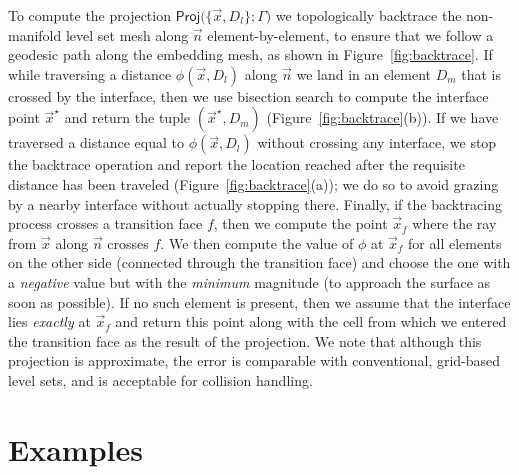 To compute the projection
$\textsf{Proj(}\{\vec{x},D_l\};\Gamma\textsf{)}$ we topologically
backtrace the non-manifold level set mesh along $\vec{n}$
element-by-element, to ensure that we follow a geodesic path along the
embedding mesh, as shown in Figure~\ref{fig:backtrace}. If while
traversing a distance $\phi(\vec{x},D_l)$ along $\vec{n}$ we land in
an element $D_m$ that is crossed by the interface, then we use
bisection search to compute the interface point $\vec{x}^\star$ and
return the tuple $(\vec{x}^\star,D_m)$
(Figure~\ref{fig:backtrace}(b)). If we have traversed a distance equal
to $\phi(\vec{x},D_l)$ without crossing any interface, we stop the
backtrace operation and report the location reached after the
requisite distance has been traveled (Figure~\ref{fig:backtrace}(a));
we do so to avoid grazing by a nearby interface without actually
stopping there. Finally, if the backtracing process crosses a
transition face $f$, then we compute the point $\vec{x}_f$ where the
ray from $\vec{x}$ along $\vec{n}$ crosses $f$. We then compute the
value of $\phi$ at $\vec{x}_f$ for all elements on the other side
(connected through the transition face) and choose the one with a
\emph{negative} value but with the \emph{minimum} magnitude (to
approach the surface as soon as possible). If no such element is
present, then we assume that the interface lies \emph{exactly} at
$\vec{x}_f$ and return this point along with the cell from which we
entered the transition face as the result of the projection. We note
that although this projection is approximate, the error is comparable
with conventional, grid-based level sets, and is acceptable for
collision handling.





\section{Examples}
\label{sec:examples}


